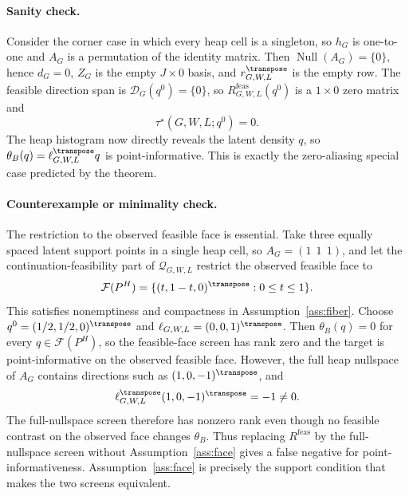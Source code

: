 \paragraph{Sanity check.}
Consider the corner case in which every heap cell is a singleton, so \(h_G\) is one-to-one and \(A_G\) is a permutation of the identity matrix.  Then \(\operatorname{Null}(A_G)=\{0\}\), hence \(d_G=0\), \(Z_G\) is the empty \(J\times0\) basis, and \(r_{G,W,L}^{\transpose}\) is the empty row.  The feasible direction span is \(\mathcal{D}_G(q^0)=\{0\}\), so \(R^{\mathrm{feas}}_{G,W,L}(q^0)\) is a \(1\times0\) zero matrix and
\[
\tau^\star(G,W,L;q^0)=0.
\]
The heap histogram now directly reveals the latent density \(q\), so \(\theta_B(q)=\ell_{G,W,L}^{\transpose}q\) is point-informative.  This is exactly the zero-aliasing special case predicted by the theorem.

\paragraph{Counterexample or minimality check.}
The restriction to the observed feasible face is essential.  Take three equally spaced latent support points in a single heap cell, so \(A_G=(1\ \ 1\ \ 1)\), and let the continuation-feasibility part of \(\mathcal{Q}_{G,W,L}\) restrict the observed feasible face to
\[
\mathcal{F}(P^H)=\{(t,1-t,0)^{\transpose}:0\le t\le1\}.
\]
This satisfies nonemptiness and compactness in Assumption~\ref{ass:fiber}.  Choose \(q^0=(1/2,1/2,0)^{\transpose}\) and \(\ell_{G,W,L}=(0,0,1)^{\transpose}\).  Then \(\theta_B(q)=0\) for every \(q\in\mathcal{F}(P^H)\), so the feasible-face screen has rank zero and the target is point-informative on the observed feasible face.  However, the full heap nullspace of \(A_G\) contains directions such as \((1,0,-1)^{\transpose}\), and
\[
\ell_{G,W,L}^{\transpose}(1,0,-1)^{\transpose}=-1\ne0.
\]
The full-nullspace screen therefore has nonzero rank even though no feasible contrast on the observed face changes \(\theta_B\).  Thus replacing \(R^{\mathrm{feas}}\) by the full-nullspace screen without Assumption~\ref{ass:face} gives a false negative for point-informativeness.  Assumption~\ref{ass:face} is precisely the support condition that makes the two screens equivalent.

